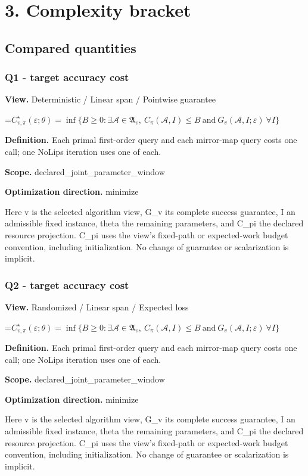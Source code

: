 \documentclass[10pt,a4paper]{article}
\newcommand{\AtlasMath}[1]{\par\begingroup\centering\setbox0=\hbox{$\displaystyle #1$}\ifdim\wd0>1.4\linewidth\typeout{ATLAS WIDE FORMULA: \the\wd0}\fi\ifdim\wd0>\linewidth\resizebox{\linewidth}{!}{\box0}\else\box0\fi\par\endgroup}
\begin{document}
\section{3. Complexity bracket}
\subsection{Compared quantities}
\subsubsection{Q1 - target accuracy cost}
\textbf{View.} Deterministic / Linear span / Pointwise guarantee

\AtlasMath{C^\star_{v,\pi}(\varepsilon;\theta)=\inf\{B\ge0:\exists\mathcal A\in\mathfrak A_v,\ C_\pi(\mathcal A,I)\le B\ \text{and}\ G_v(\mathcal A,I;\varepsilon)\ \forall I\}}
\textbf{Definition.} Each primal first-order query and each mirror-map query costs one call; one NoLips iteration uses one of each.

\textbf{Scope.} declared\_joint\_parameter\_window

\textbf{Optimization direction.} minimize

Here v is the selected algorithm view, G\_v its complete success guarantee, I an admissible fixed instance, theta the remaining parameters, and C\_pi the declared resource projection. C\_pi uses the view's fixed-path or expected-work budget convention, including initialization. No change of guarantee or scalarization is implicit.

\subsubsection{Q2 - target accuracy cost}
\textbf{View.} Randomized / Linear span / Expected loss

\AtlasMath{C^\star_{v,\pi}(\varepsilon;\theta)=\inf\{B\ge0:\exists\mathcal A\in\mathfrak A_v,\ C_\pi(\mathcal A,I)\le B\ \text{and}\ G_v(\mathcal A,I;\varepsilon)\ \forall I\}}
\textbf{Definition.} Each primal first-order query and each mirror-map query costs one call; one NoLips iteration uses one of each.

\textbf{Scope.} declared\_joint\_parameter\_window

\textbf{Optimization direction.} minimize

Here v is the selected algorithm view, G\_v its complete success guarantee, I an admissible fixed instance, theta the remaining parameters, and C\_pi the declared resource projection. C\_pi uses the view's fixed-path or expected-work budget convention, including initialization. No change of guarantee or scalarization is implicit.
\end{document}
